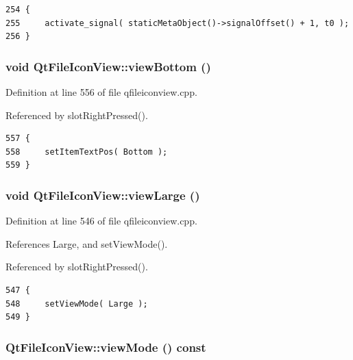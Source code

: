 \footnotesize\begin{verbatim}254 {
255     activate_signal( staticMetaObject()->signalOffset() + 1, t0 );
256 }
\end{verbatim}\normalsize 
{}
\subsubsection{\setlength{\rightskip}{0pt plus 5cm}void Qt\-File\-Icon\-View::view\-Bottom ()\hspace{0.3cm}{\tt  [protected, slot]}}\label{classQtFileIconView_QtFileIconViewj5}




Definition at line 556 of file qfileiconview.cpp.

Referenced by slot\-Right\-Pressed().



\footnotesize\begin{verbatim}557 {
558     setItemTextPos( Bottom );
559 }
\end{verbatim}\normalsize 
{}
\subsubsection{\setlength{\rightskip}{0pt plus 5cm}void Qt\-File\-Icon\-View::view\-Large ()\hspace{0.3cm}{\tt  [protected, slot]}}\label{classQtFileIconView_QtFileIconViewj3}




Definition at line 546 of file qfileiconview.cpp.

References Large, and set\-View\-Mode().

Referenced by slot\-Right\-Pressed().



\footnotesize\begin{verbatim}547 {
548     setViewMode( Large );
549 }
\end{verbatim}\normalsize 
{}
\subsubsection{ Qt\-File\-Icon\-View::view\-Mode () const\hspace{0.3cm}{\tt  [inline]}}\label{classQtFileIconView_QtFileIconViewa2}




